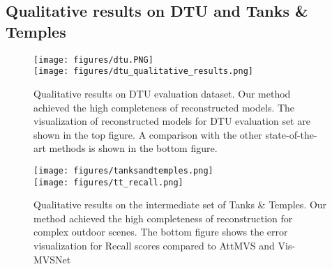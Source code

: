 \documentclass{article} \usepackage{iclr2022_conference,times}
\begin{document}
\subsection{Qualitative results on DTU and Tanks \& Temples}
\label{a5}
\begin{figure}[h]
\begin{center}
\texttt{[image: figures/dtu.PNG]} \\
\texttt{[image: figures/dtu\_qualitative\_results.png]}
\end{center}
\caption{Qualitative results on DTU evaluation dataset. Our method achieved the high completeness of reconstructed models. The visualization of reconstructed models for DTU evaluation set are shown in the top figure. A comparison with the other state-of-the-art methods is shown in the bottom figure.}
\label{dtu_results}
\end{figure}
\begin{figure}[h]
\begin{center}
\texttt{[image: figures/tanksandtemples.png]} \\
\texttt{[image: figures/tt\_recall.png]}
\end{center}
\caption{Qualitative results on the intermediate set of Tanks \& Temples. Our method achieved the high completeness of reconstruction for complex outdoor scenes. The bottom figure shows the error visualization for Recall scores compared to AttMVS \citep{luo2020attention} and Vis-MVSNet \citep{zhang2020visibility}}
\label{tt_results}
\end{figure}
\end{document}
